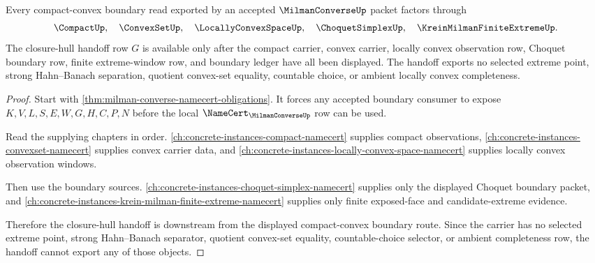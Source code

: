 \begin{theorem}
\label{thm:milman-converse-compact-convex-handoff}
Every compact-convex boundary read exported by an accepted $\MilmanConverseUp$ packet factors through
$$
\CompactUp,\quad \ConvexSetUp,\quad \LocallyConvexSpaceUp,\quad \ChoquetSimplexUp,\quad \KreinMilmanFiniteExtremeUp .
$$
The closure-hull handoff row $G$ is available only after the compact carrier, convex carrier, locally convex observation row, Choquet boundary row, finite extreme-window row, and boundary ledger have all been displayed. The handoff exports no selected extreme point, strong Hahn--Banach separation, quotient convex-set equality, countable choice, or ambient locally convex completeness.
\end{theorem}
\begin{proof}
Start with \autoref{thm:milman-converse-namecert-obligations}. It forces any accepted boundary consumer to expose $K,V,L,S,E,W,G,H,C,P,N$ before the local $\NameCert_{\MilmanConverseUp}$ row can be used.

Read the supplying chapters in order. \autoref{ch:concrete-instances-compact-namecert} supplies compact observations, \autoref{ch:concrete-instances-convexset-namecert} supplies convex carrier data, and \autoref{ch:concrete-instances-locally-convex-space-namecert} supplies locally convex observation windows.

Then use the boundary sources. \autoref{ch:concrete-instances-choquet-simplex-namecert} supplies only the displayed Choquet boundary packet, and \autoref{ch:concrete-instances-krein-milman-finite-extreme-namecert} supplies only finite exposed-face and candidate-extreme evidence.

Therefore the closure-hull handoff is downstream from the displayed compact-convex boundary route. Since the carrier has no selected extreme point, strong Hahn--Banach separator, quotient convex-set equality, countable-choice selector, or ambient completeness row, the handoff cannot export any of those objects.
\end{proof}



